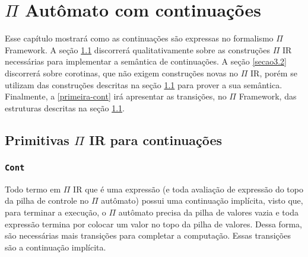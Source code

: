 
\chapter{$\Pi$ Autômato com continuações}\label{cap3}
Esse capítulo mostrará como as continuações são expressas no formalismo $\Pi$ Framework.
A seção \ref{secao3.1} discorrerá qualitativamente sobre as construções $\Pi$ IR necessárias para implementar a semântica de continuações. A seção \ref{secao3.2} discorrerá sobre corotinas, que não exigem construções novas no $\Pi$ IR, porém se utilizam das construções descritas na seção \ref{secao3.1} para prover a sua semântica. Finalmente, a \ref{primeira-cont} irá apresentar as transições, no $\Pi$ Framework, das estruturas descritas na seção \ref{secao3.1}.

\section{Primitivas $\Pi$ IR para continuações}\label{secao3.1}

\subsection{\texttt{Cont}}

Todo termo em $\Pi$ IR que é uma expressão (e toda avaliação de expressão do topo da pilha de controle no $\Pi$ autômato) possui uma continuação implícita, visto que, para terminar a execução, o $\Pi$ autômato precisa da pilha de valores vazia e toda expressão termina por colocar um valor no topo da pilha de valores. Dessa forma, são necessárias mais transições para completar a computação. Essas transições são a continuação implícita. 

